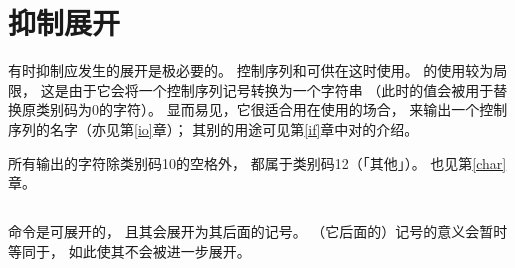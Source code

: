 \documentclass{book}
\begin{document}
\section{抑制展开}

有时抑制应发生的展开是极必要的。
控制序列和可供在这时使用。
的使用较为局限，
这是由于它会将一个控制序列记号转换为一个字符串
（此时的值会被用于替换原类别码为0的字符）。
显而易见，它很适合用在使用的场合，                        
来输出一个控制序列的名字（亦见第\ref{io}章）；
其别的用途可见第\ref{if}章中对的介绍。

所有输出的字符除类别码10的空格外，
都属于类别码12（「其他」）。
也见第\ref{char}章。

\subsection{\protect{}}

命令是可展开的，
且其会展开为其后面的记号。
（它后面的）记号的意义会暂时等同于，
如此使其不会被进一步展开。
\end{document}
